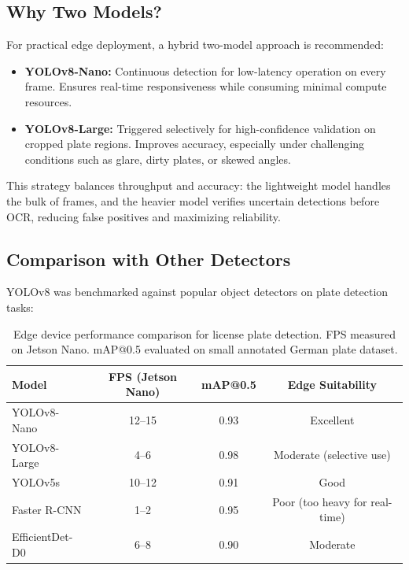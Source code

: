 	\subsection{Why Two Models?}
	
	For practical edge deployment, a hybrid two-model approach is recommended:
	\begin{itemize}
		\item \textbf{YOLOv8-Nano:} Continuous detection for low-latency operation on every frame. Ensures real-time responsiveness while consuming minimal compute resources.
		\item \textbf{YOLOv8-Large:} Triggered selectively for high-confidence validation on cropped plate regions. Improves accuracy, especially under challenging conditions such as glare, dirty plates, or skewed angles.
	\end{itemize}
	
	This strategy balances throughput and accuracy: the lightweight model handles the bulk of frames, and the heavier model verifies uncertain detections before OCR, reducing false positives and maximizing reliability.
	
	\subsection{Comparison with Other Detectors}
	
	YOLOv8 was benchmarked against popular object detectors on plate detection tasks:
	
	\begin{table}[h]
		\centering
		\begin{tabular}{|l|c|c|c|}
			\hline
			\textbf{Model} & \textbf{FPS (Jetson Nano)} & \textbf{mAP@0.5} & \textbf{Edge Suitability} \\
			\hline
			YOLOv8-Nano & 12--15 & 0.93 & Excellent \\
			YOLOv8-Large & 4--6 & 0.98 & Moderate (selective use) \\
			YOLOv5s & 10--12 & 0.91 & Good \\
			Faster R-CNN & 1--2 & 0.95 & Poor (too heavy for real-time) \\
			EfficientDet-D0 & 6--8 & 0.90 & Moderate \\
			\hline
		\end{tabular}
		\caption{Edge device performance comparison for license plate detection. FPS measured on Jetson Nano. mAP@0.5 evaluated on small annotated German plate dataset.}
	\end{table}
	
